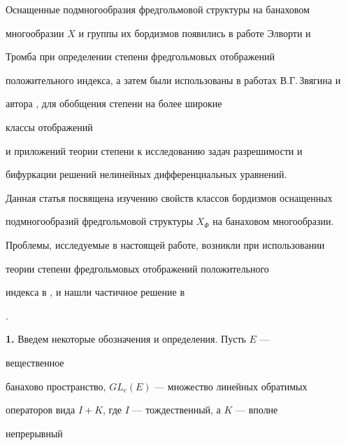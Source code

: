 

 


\maketitle 


 




 


Оснащенные подмногообразия фредгольмовой структуры на банаховом 


многообразии $X$ и группы их бордизмов появились в работе Элворти и 


Тромба \cite{Elw} при определении степени фредгольмовых отображений 


положительного индекса, а затем были использованы в работах В.Г.\,Звягина и 


автора \cite{Zv1}, \cite{Zv2} для обобщения степени на более широкие 


классы отображений 


и приложений теории степени к исследованию задач разрешимости и 


бифуркации решений нелинейных дифференциальных уравнений. 


 


Данная статья посвящена изучению свойств классов бордизмов оснащенных 


подмногообразий фредгольмовой структуры $X_\Phi$ на банаховом многообразии. 


Проблемы, исследуемые в настоящей работе, возникли при использовании 


теории степени фредгольмовых отображений положительного 


индекса в \cite{Zv1}, \cite{Zv2} и нашли частичное решение в 


\cite{Zv2}. 


 


{\bf 1.} Введем некоторые обозначения и определения. Пусть $E$ --- 


вещественное 


банахово пространство, $GL_c(E)$ --- множество линейных обратимых 


операторов вида $I+K$, где $I$ --- тождественный, а $K$ --- вполне 


непрерывный 


